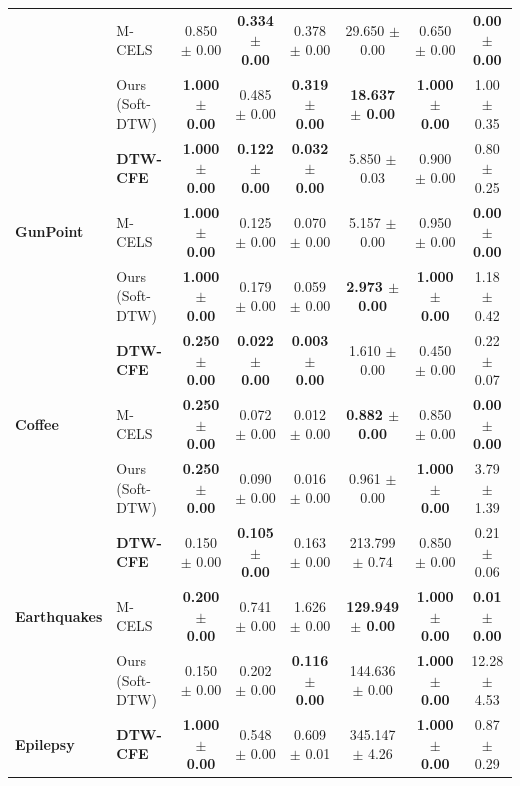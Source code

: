 \documentclass[11pt,a4paper]{report}
\begin{document}
\begin{table}[h!]
\begin{tabular}{llcccccc}
        & M-CELS & 0.850 $\pm$ 0.00 & \textbf{0.334 $\pm$ 0.00} & 0.378 $\pm$ 0.00 & 29.650 $\pm$ 0.00 & 0.650 $\pm$ 0.00 & \textbf{0.00 $\pm$ 0.00} \\
        & Ours (Soft-DTW) & \textbf{1.000 $\pm$ 0.00} & 0.485 $\pm$ 0.00 & \textbf{0.319 $\pm$ 0.00} & \textbf{18.637 $\pm$ 0.00} & \textbf{1.000 $\pm$ 0.00} & 1.00 $\pm$ 0.35 \\
        \midrule
        \multirow{3}{*}{\textbf{GunPoint}} 
        & \textbf{DTW-CFE} & \textbf{1.000 $\pm$ 0.00} & \textbf{0.122 $\pm$ 0.00} & \textbf{0.032 $\pm$ 0.00} & 5.850 $\pm$ 0.03 & 0.900 $\pm$ 0.00 & 0.80 $\pm$ 0.25 \\
        & M-CELS & \textbf{1.000 $\pm$ 0.00} & 0.125 $\pm$ 0.00 & 0.070 $\pm$ 0.00 & 5.157 $\pm$ 0.00 & 0.950 $\pm$ 0.00 & \textbf{0.00 $\pm$ 0.00} \\
        & Ours (Soft-DTW) & \textbf{1.000 $\pm$ 0.00} & 0.179 $\pm$ 0.00 & 0.059 $\pm$ 0.00 & \textbf{2.973 $\pm$ 0.00} & \textbf{1.000 $\pm$ 0.00} & 1.18 $\pm$ 0.42 \\
        \midrule
        \multirow{3}{*}{\textbf{Coffee}} 
        & \textbf{DTW-CFE} & \textbf{0.250 $\pm$ 0.00} & \textbf{0.022 $\pm$ 0.00} & \textbf{0.003 $\pm$ 0.00} & 1.610 $\pm$ 0.00 & 0.450 $\pm$ 0.00 & 0.22 $\pm$ 0.07 \\
        & M-CELS & \textbf{0.250 $\pm$ 0.00} & 0.072 $\pm$ 0.00 & 0.012 $\pm$ 0.00 & \textbf{0.882 $\pm$ 0.00} & 0.850 $\pm$ 0.00 & \textbf{0.00 $\pm$ 0.00} \\
        & Ours (Soft-DTW) & \textbf{0.250 $\pm$ 0.00} & 0.090 $\pm$ 0.00 & 0.016 $\pm$ 0.00 & 0.961 $\pm$ 0.00 & \textbf{1.000 $\pm$ 0.00} & 3.79 $\pm$ 1.39 \\
        \midrule
        \multirow{3}{*}{\textbf{Earthquakes}} 
        & \textbf{DTW-CFE} & 0.150 $\pm$ 0.00 & \textbf{0.105 $\pm$ 0.00} & 0.163 $\pm$ 0.00 & 213.799 $\pm$ 0.74 & 0.850 $\pm$ 0.00 & 0.21 $\pm$ 0.06 \\
        & M-CELS & \textbf{0.200 $\pm$ 0.00} & 0.741 $\pm$ 0.00 & 1.626 $\pm$ 0.00 & \textbf{129.949 $\pm$ 0.00} & \textbf{1.000 $\pm$ 0.00} & \textbf{0.01 $\pm$ 0.00} \\
        & Ours (Soft-DTW) & 0.150 $\pm$ 0.00 & 0.202 $\pm$ 0.00 & \textbf{0.116 $\pm$ 0.00} & 144.636 $\pm$ 0.00 & \textbf{1.000 $\pm$ 0.00} & 12.28 $\pm$ 4.53 \\
        \midrule
        \multirow{3}{*}{\textbf{Epilepsy}} 
        & \textbf{DTW-CFE} & \textbf{1.000 $\pm$ 0.00} & 0.548 $\pm$ 0.00 & 0.609 $\pm$ 0.01 & 345.147 $\pm$ 4.26 & \textbf{1.000 $\pm$ 0.00} & 0.87 $\pm$ 0.29 \\

\end{tabular}
\end{table}
\end{document}
